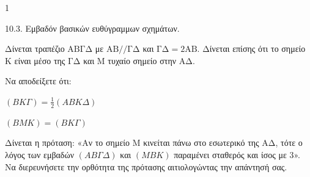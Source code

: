 \begin{ylh}{1}
    \item 10.3. Εμβαδόν βασικών ευθύγραμμων σχημάτων.
\end{ylh}
\begin{figure} %
\centering
{}
\end{figure}
Δίνεται τραπέζιο $\mathrm{AB\Gamma\Delta}$ με $\mathrm{AB} // \mathrm{\Gamma\Delta}$ και $\mathrm{\Gamma\Delta} = 2\mathrm{AB}$. Δίνεται επίσης ότι το σημείο $\mathrm{K}$ είναι μέσο της $\mathrm{\Gamma\Delta}$ και $\mathrm{M}$ τυχαίο σημείο στην $\mathrm{A\Delta}$.

\begin{alist}
    \item Να αποδείξετε ότι:
    \begin{rlist}
        \item $(B K \Gamma) = \frac{1}{2}(A B K \Delta)$ 
        \item $(B M K) = (B K \Gamma)$ 
    \end{rlist}
    \item Δίνεται η πρόταση: «Αν το σημείο $\mathrm{M}$ κινείται πάνω στο εσωτερικό της $\mathrm{A\Delta}$, τότε ο λόγος των εμβαδών $(A B \Gamma \Delta)$ και $(M B K)$ παραμένει σταθερός και ίσος με $3$». Να διερευνήσετε την ορθότητα της πρότασης αιτιολογώντας την απάντησή σας. 
\end{alist}
